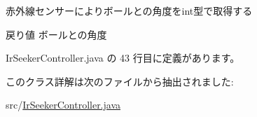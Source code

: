 赤外線センサーによりボールとの角度をint型で取得する \begin{DoxyReturn}{戻り値}
ボールとの角度 
\end{DoxyReturn}


 Ir\+Seeker\+Controller.\+java の 43 行目に定義があります。



このクラス詳解は次のファイルから抽出されました\+:\begin{DoxyCompactItemize}
\item 
src/\mbox{\hyperlink{_ir_seeker_controller_8java}{Ir\+Seeker\+Controller.\+java}}\end{DoxyCompactItemize}
